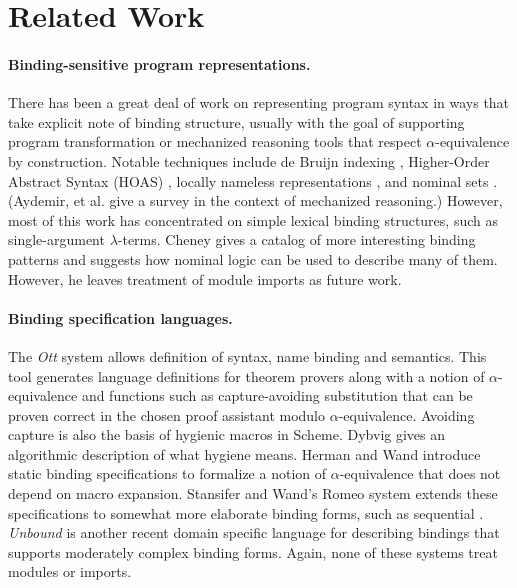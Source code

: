 \section{Related Work}

\paragraph{Binding-sensitive program representations.}

There has been a great deal of work on representing program syntax in
ways that take explicit note of binding structure, usually with the goal
of supporting program transformation or mechanized reasoning tools that
respect $\alpha$-equivalence by construction. Notable techniques include
de Bruijn indexing \cite{deBruijn72}, Higher-Order Abstract Syntax
(HOAS) \cite{DBLP:conf/pldi/PfenningE88}, locally nameless representations
\cite{Chargueraud12}, and nominal sets
\cite{GabbayP02}. (Aydemir, et al.
\cite{AydemirCPPW08} give a survey in the context of mechanized
reasoning.) However, most of this work has concentrated on simple
lexical binding structures, such as single-argument $\lambda$-terms.
Cheney \cite{Cheney05a} gives a catalog of more
interesting binding patterns and suggests how nominal logic can be used
to describe many of them. However, he leaves treatment of module imports
as future work.

\paragraph{Binding specification languages.}

The \emph{Ott} system \cite{SewellNOPRSS10} allows definition of syntax,
name binding and semantics. This tool generates language definitions for
theorem provers along with a notion of $\alpha$-equivalence and
functions such as capture-avoiding substitution that can be proven
correct in the chosen proof assistant modulo 
$\alpha$-equivalence. Avoiding capture is also the basis of hygienic
macros in Scheme. Dybvig \cite{DybvigHB92} gives an algorithmic
description of what hygiene means. Herman and Wand
\cite{HermanW08,Herman2010} introduce static binding specifications to
formalize a notion of $\alpha$-equivalence that does not depend on macro
expansion. Stansifer and Wand's Romeo system
\cite{StansiferW14} extends these specifications to somewhat
more elaborate binding forms, such as sequential .
\emph{Unbound} \cite{WeirichYS11} is another recent
domain specific language for describing bindings that supports
moderately complex binding forms. Again, none of these systems treat
modules or imports.

